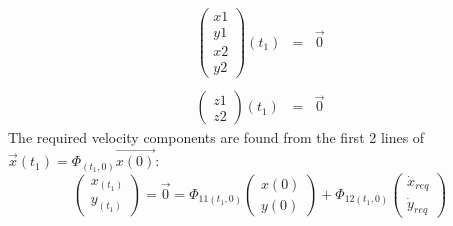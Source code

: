 \documentclass[11pt, a4paper]{article}
\begin{document}
\begin{equation}
    \begin{matrix}
        \begin{pmatrix}
            x1\\
            y1\\
            x2\\
            y2
        \end{pmatrix}(t_1) & = & \vec{0} \\\\
        \begin{pmatrix}
            z1\\
            z2
        \end{pmatrix}(t_1) & = & \vec{0}
    \end{matrix}
\end{equation}
The required velocity components are found from the first 2 lines of $\vec{x}(t_1)=\Phi_(t_1,0)\vec{x(0)}$:
\begin{equation}
    \begin{pmatrix}
        x_{(t_1)}\\y_{(t_1)}
    \end{pmatrix} = \vec{0} = \Phi_{11(t_1, 0)}\begin{pmatrix}
        x(0)\\y(0)
    \end{pmatrix} + \Phi_{12(t_1,0)}\begin{pmatrix}
        \dot{x}_{req} \\
        \dot{y}_{req}
    \end{pmatrix}
\end{equation}
\end{document}
